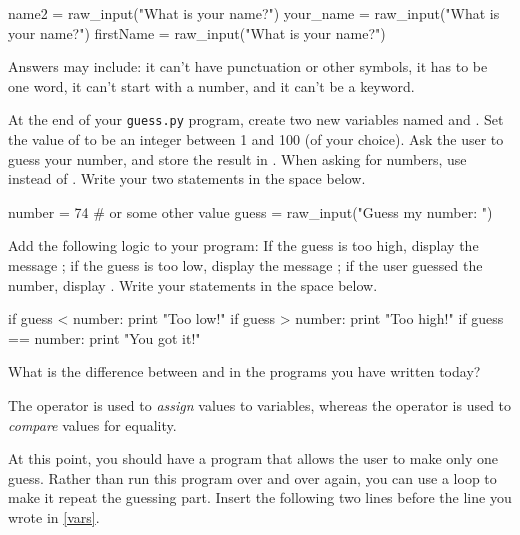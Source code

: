 \begin{pythlst}
    name2 = raw_input("What is your name?")
    your_name = raw_input("What is your name?")
    firstName = raw_input("What is your name?")
\end{pythlst}

\begin{answer}
Answers may include: it can't have punctuation or other symbols, it has to be one word, it can't start with a number, and it can't be a keyword.
\end{answer}


\Q \label{vars} At the end of your \texttt{guess.py} program, create two new variables named  and .
Set the value of  to be an integer between 1 and 100 (of your choice).
Ask the user to guess your number, and store the result in .
When asking for numbers, use  instead of .
Write your two statements in the space below.

\begin{answer}
\begin{pythans}
number = 74  # or some other value
guess = raw_input("Guess my number: ")
\end{pythans}
\end{answer}


\Q Add the following logic to your program:
If the guess is too high, display the message ;
if the guess is too low, display the message ;
if the user guessed the number, display .
Write your statements in the space below.

\begin{answer}[9em]
\begin{pythans}
    if guess < number:
        print "Too low!"
    if guess > number:
        print "Too high!"
    if guess == number:
        print "You got it!"
\end{pythans}
\end{answer}


\Q What is the difference between \pyth{=} and \pyth{==} in the programs you have written today?

\begin{answer}
The \pyth{=} operator is used to \emph{assign} values to variables, whereas the \pyth{==} operator is used to \emph{compare} values for equality.
\end{answer}


\Q At this point, you should have a program that allows the user to make only one guess.
Rather than run this program over and over again, you can use a  loop to make it repeat the guessing part.
Insert the following two lines before the  line you wrote in \ref{vars}.

